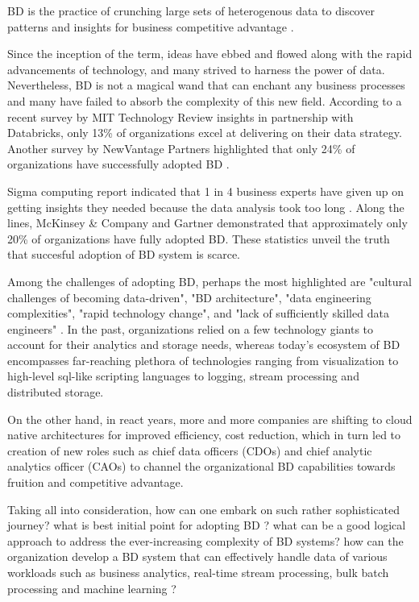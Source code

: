\documentclass[runningheads]{llncs}
\begin{document}
BD is the practice of crunching large sets of heterogenous data to discover patterns and insights for business competitive advantage \cite{AtaeiHype}\cite{Huberty}.

Since the inception of the term, ideas have ebbed and flowed along with the rapid advancements of technology, and many strived to harness the power of data. Nevertheless, BD is not a magical wand that can enchant any business processes and many have failed to absorb the complexity of this new field. According to a recent survey by MIT Technology Review insights in partnership with Databricks, only 13\% of organizations excel at delivering on their data strategy. Another survey by NewVantage Partners highlighted that only 24\% of organizations have successfully adopted BD \cite{NewVantageSurvey}. 

Sigma computing report indicated that 1 in 4 business experts have given up on getting insights they needed because the data analysis took too long \cite{SigmaSurvey}. Along the lines, McKinsey \& Company \cite{mckines} and Gartner \cite{GartnerSury} demonstrated that approximately only 20\% of organizations have fully adopted BD. These statistics unveil the truth that succesful adoption of BD system is scarce. 

Among the challenges of adopting BD, perhaps the most highlighted are "cultural challenges of becoming data-driven", "BD architecture", "data engineering complexities", "rapid technology change", and "lack of sufficiently skilled data engineers" \cite{sivarajah2017critical}\cite{AtaeiBigDataEnvirons}. In the past, organizations relied on a few technology giants to account for their analytics and storage needs, whereas today's ecosystem of BD encompasses far-reaching plethora of technologies ranging from visualization to high-level sql-like scripting languages to logging, stream processing and distributed storage. 

On the other hand, in react years, more and more companies are shifting to cloud native architectures for improved efficiency, cost reduction, which in turn led to creation of new roles such as chief data officers (CDOs) and chief analytic analytics officer (CAOs) to channel the organizational BD capabilities towards fruition and competitive advantage. 

Taking all into consideration, how can one embark on such rather sophisticated journey? what is best initial point for adopting BD ? what can be a good logical approach to address the ever-increasing complexity of BD systems? how can the organization develop a BD system that can effectively handle data of various workloads such as business analytics, real-time stream processing, bulk batch processing and machine learning ? 
\end{document}
